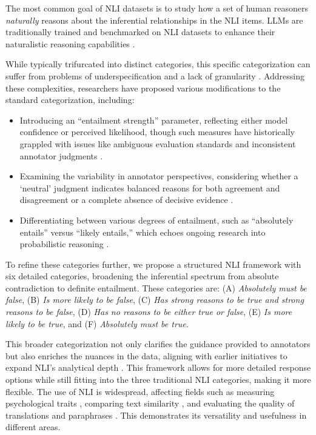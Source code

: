         The most common goal of NLI datasets is to study how a set of human reasoners \textit{naturally} reasons about the inferential relationships in the NLI items. LLMs are traditionally trained and benchmarked on NLI datasets to enhance their naturalistic reasoning capabilities \citep{bowman_large_2015, williams_broad-coverage_2018, nie_adversarial_2020, williams-etal-2022-anlizing}. 
        
        While typically trifurcated into distinct categories, this specific categorization can suffer from problems of underspecification and a lack of granularity \citep{nighojkar_no_2023}. Addressing these complexities, researchers have proposed various modifications to the standard categorization, including: 
        
        \begin{itemize}
            \item Introducing an ``entailment strength'' parameter, reflecting either model confidence or perceived likelihood, though such measures have historically grappled with issues like ambiguous evaluation standards and inconsistent annotator judgments \citep{chen_uncertain_2020, meissner_embracing_2021}.
            \item Examining the variability in annotator perspectives, considering whether a `neutral' judgment indicates balanced reasons for both agreement and disagreement or a complete absence of decisive evidence \citep{pavlick_inherent_2019, zhang_capturing_2021, zhang_identifying_2021, zhou_distributed_2022}.
            \item Differentiating between various degrees of entailment, such as ``absolutely entails'' versus ``likely entails,'' which echoes ongoing research into probabilistic reasoning \citep{Kahneman2011}.
        \end{itemize}

        To refine these categories further, we propose a structured NLI framework with six detailed categories, broadening the inferential spectrum from absolute contradiction to definite entailment. These categories are: (A) \textit{Absolutely must be false}, (B) \textit{Is more likely to be false}, (C) \textit{Has strong reasons to be true and strong reasons to be false}, (D) \textit{Has no reasons to be either true or false}, (E) \textit{Is more likely to be true}, and (F) \textit{Absolutely must be true}.

        This broader categorization not only clarifies the guidance provided to annotators but also enriches the nuances in the data, aligning with earlier initiatives to expand NLI’s analytical depth \citep{pavlick_inherent_2019, zhang_ordinal_2017}. This framework allows for more detailed response options while still fitting into the three traditional NLI categories, making it more flexible. The use of NLI is widespread, affecting fields such as measuring psychological traits \citep{Laverghetta2021c, Laverghetta2022, Laverghetta2022a, Laverghetta2023b, Laverghetta2023c}, comparing text similarity \citep{nighojkar_mutual_2021}, and evaluating the quality of translations and paraphrases \citep{nighojkar_improving_2021}. This demonstrates its versatility and usefulness in different areas.